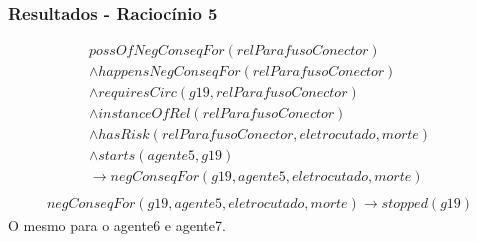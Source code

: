 \documentclass{beamer}
\begin{document}
\begin{frame}
	\frametitle{Resultados - Raciocínio 5}
	\begin{eqnarray}\nonumber
	   possOfNegConseqFor(relParafusoConector) \nonumber \\
	    \wedge happensNegConseqFor(relParafusoConector) \nonumber \\ 
	    \wedge requiresCirc(g19,relParafusoConector) \nonumber \\  
	    \wedge instanceOfRel(relParafusoConector) \nonumber \\ 
	    \wedge hasRisk(relParafusoConector,eletrocutado,morte) \nonumber \\  
	    \wedge starts(agente5,g19) \nonumber \\ 
	    \to negConseqFor(g19,agente5,eletrocutado,morte) \\ \nonumber    
	\end{eqnarray}	
	\begin{eqnarray}
		negConseqFor(g19,agente5,eletrocutado,morte) \to stopped(g19)
	\end{eqnarray}
	O mesmo para o agente6 e agente7.
\end{frame}
\end{document}
